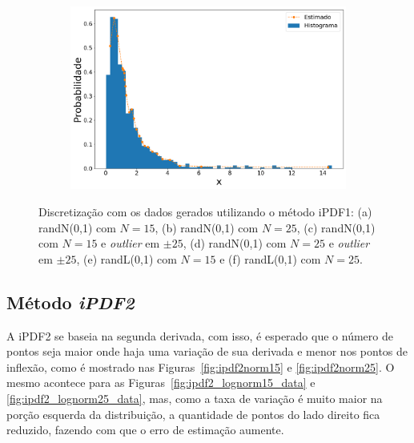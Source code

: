 \begin{figure}[H]
\begin{subfigure}[b]{0.45\textwidth}
		\includegraphics[width=\linewidth]{./figuras/iPDF1_lognormal_25_1_1000_0}
		\caption{}
		\label{fig:ipdf1_lognorm25_data}
	\end{subfigure}
	\caption{Discretização com os dados gerados utilizando o método \ac{iPDF1}: (a) randN(0,1) com $N = 15$, (b) randN(0,1) com $N = 25$, (c) randN(0,1) com $N = 15$ e \textit{outlier} em $\pm 25$, (d) randN(0,1) com $N = 25$ e \textit{outlier} em $\pm 25$, (e) randL(0,1) com $ N = 15 $ e (f) randL(0,1) com $ N = 25 $.}
	\label{fig:ipdf1_data}
\end{figure}


\subsection{Método \textit{iPDF2}}

A \ac{iPDF2} se baseia na segunda derivada, com isso, é esperado que o número de pontos seja maior onde haja uma variação de sua derivada e menor nos pontos de inflexão, como é mostrado nas Figuras~\ref{fig:ipdf2norm15} e \ref{fig:ipdf2norm25}. O mesmo acontece para as Figuras~\ref{fig:ipdf2_lognorm15_data} e \ref{fig:ipdf2_lognorm25_data}, mas, como a taxa de variação é muito maior na porção esquerda da distribuição, a quantidade de pontos do lado direito fica reduzido, fazendo com que o erro de estimação aumente.

